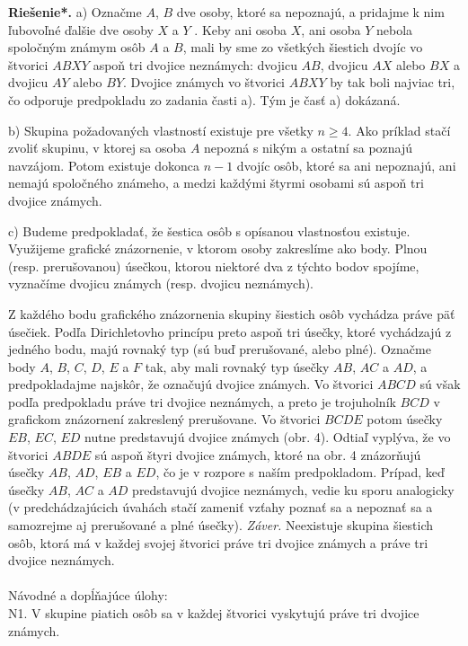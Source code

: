\documentclass[11pt,a4paper,oneside,final]{book}
\newcommand{\rieh}{\textbf{Riešenie*.} }
\begin{document}
\rieh a) Označme $A$, $B$ dve osoby, ktoré sa nepoznajú, a pridajme k nim ľubovoľné ďalšie dve osoby $X$ a $Y$ . Keby ani osoba $X$, ani osoba $Y$ nebola spoločným známym osôb $A$ a $B$, mali by sme zo všetkých šiestich dvojíc vo štvorici $ABXY$ aspoň tri dvojice neznámych: dvojicu $AB$, dvojicu $AX$ alebo $BX$ a dvojicu $AY$ alebo $BY$. Dvojice známych vo štvorici $ABXY$ by tak boli najviac tri, čo odporuje predpokladu zo zadania časti a). Tým je časť a) dokázaná.

b) Skupina požadovaných vlastností existuje pre všetky $n \geq 4$. Ako príklad stačí zvoliť skupinu, v ktorej sa osoba $A$ nepozná s nikým a ostatní sa poznajú navzájom. Potom existuje dokonca $n-1$ dvojíc osôb, ktoré sa ani nepoznajú, ani nemajú spoločného známeho, a medzi každými štyrmi osobami sú aspoň tri dvojice známych.

c) Budeme predpokladať, že šestica osôb s opísanou vlastnosťou existuje. Využijeme grafické znázornenie, v ktorom osoby zakreslíme ako body. Plnou (resp. prerušovanou) úsečkou, ktorou niektoré dva z týchto bodov spojíme, vyznačíme dvojicu známych (resp. dvojicu neznámych).

Z každého bodu grafického znázornenia skupiny šiestich osôb vychádza práve päť úsečiek. Podľa Dirichletovho princípu preto aspoň tri úsečky, ktoré vychádzajú z jedného bodu, majú rovnaký typ (sú buď prerušované, alebo plné). Označme body $A$, $B$, $C$, $D$, $E$ a $F$ tak, aby mali rovnaký typ úsečky $AB$, $AC$ a $AD$, a predpokladajme najskôr, že označujú dvojice známych. Vo štvorici $ABCD$ sú však podľa predpokladu práve tri dvojice neznámych, a preto je trojuholník $BCD$ v grafickom znázornení zakreslený prerušovane. Vo štvorici $BCDE$ potom úsečky $EB$, $EC$, $ED$ nutne predstavujú dvojice známych (obr. 4). Odtiaľ vyplýva, že vo štvorici $ABDE$ sú aspoň štyri dvojice známych, ktoré na obr. 4 znázorňujú úsečky $AB$, $AD$, $EB$ a $ED$, čo je v rozpore s naším predpokladom. Prípad, keď úsečky $AB$, $AC$ a $AD$ predstavujú dvojice neznámych, vedie ku sporu analogicky (v predchádzajúcich úvahách stačí zameniť vzťahy poznať sa a nepoznať sa a samozrejme aj prerušované a plné úsečky).
\textit{Záver.} Neexistuje skupina šiestich osôb, ktorá má v každej svojej štvorici práve tri dvojice známych a práve tri dvojice neznámych.\\
\\

Návodné a dopĺňajúce úlohy:\\
N1. V skupine piatich osôb sa v každej štvorici vyskytujú práve tri dvojice známych.
\end{document}
